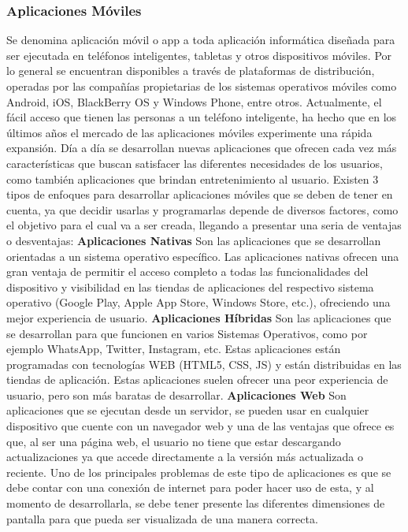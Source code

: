 \documentclass[12pt,letterpaper,openany]{book}
\begin{document}
\subsubsection{Aplicaciones Móviles}
Se denomina aplicación móvil o app a toda aplicación informática diseñada para ser ejecutada en teléfonos inteligentes, tabletas y otros dispositivos móviles. Por lo general se encuentran disponibles a través de plataformas de distribución, operadas por las compañías propietarias de los sistemas operativos móviles como Android, iOS, BlackBerry OS y Windows Phone, entre otros\cite{2}.
\vspace{5mm}\newline
Actualmente, el fácil acceso que tienen las personas a un teléfono inteligente, ha hecho que en los últimos años el mercado de las aplicaciones móviles experimente una rápida expansión. Día a día se desarrollan nuevas aplicaciones que ofrecen cada vez más características que buscan satisfacer las diferentes necesidades de los usuarios, como también aplicaciones que brindan entretenimiento al usuario.
\vspace{5mm}\newline
Existen 3 tipos de enfoques para desarrollar aplicaciones móviles que se deben de tener en cuenta, ya que decidir usarlas y programarlas depende de diversos factores, como el objetivo para el cual va a ser creada, llegando a presentar una seria de ventajas o desventajas:
\vspace{5mm}\newline
\textbf{Aplicaciones Nativas}\newline
Son las aplicaciones que se desarrollan orientadas a un sistema operativo específico. Las aplicaciones nativas ofrecen una gran ventaja de permitir el acceso completo a todas las funcionalidades del dispositivo y visibilidad en las tiendas de aplicaciones del respectivo sistema operativo (Google Play, Apple App Store, Windows Store, etc.), ofreciendo una mejor experiencia de usuario.
\vspace{5mm}\newline
\textbf{Aplicaciones Híbridas}\newline
Son las aplicaciones que se desarrollan para que funcionen en varios Sistemas Operativos, como por ejemplo WhatsApp, Twitter, Instagram, etc. Estas aplicaciones están programadas con tecnologías WEB (HTML5, CSS, JS) y están distribuidas en las tiendas de aplicación.
Estas aplicaciones suelen ofrecer una peor experiencia de usuario, pero son más baratas de desarrollar.
\vspace{5mm}\newline
\textbf{Aplicaciones Web}\newline
Son aplicaciones que se ejecutan desde un servidor, se pueden usar en cualquier dispositivo que cuente con un navegador web y una de las ventajas que ofrece es que, al ser una página web, el usuario no tiene que estar descargando actualizaciones ya que accede directamente a la versión más actualizada o reciente.
Uno de los principales problemas de este tipo de aplicaciones es que se debe contar con una conexión de internet para poder hacer uso de esta, y al momento de desarrollarla, se debe tener presente las diferentes dimensiones de pantalla para que pueda ser visualizada de una manera correcta.
\end{document}
